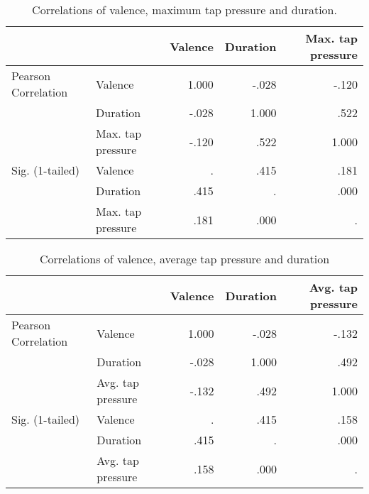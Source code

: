 \begin{table}[ht]
\centering
\begin{tabular}{@{}llrrr@{}}
                    &                   & Valence & Duration & Max. tap pressure \\ \midrule
Pearson Correlation & Valence           & 1.000   & -.028    & -.120             \\
                    & Duration          & -.028   & 1.000    & .522              \\
                    & Max. tap pressure & -.120   & .522     & 1.000             \\ \midrule
Sig. (1-tailed)     & Valence           & .       & .415     & .181              \\
                    & Duration          & .415    & .        & .000              \\
                    & Max. tap pressure & .181    & .000     & .                
\end{tabular}
\caption{Correlations of valence, maximum tap pressure and duration.}
\label{tab:correlations_valmax}
\end{table}

\par\bigskip

\begin{table}[ht]
\centering
\begin{tabular}{@{}llrrr@{}}
                    &                   & Valence & Duration & Avg. tap pressure \\ \midrule
Pearson Correlation & Valence           & 1.000   & -.028    & -.132             \\
                    & Duration          & -.028   & 1.000    & .492              \\
                    & Avg. tap pressure & -.132   & .492     & 1.000             \\ \midrule
Sig. (1-tailed)     & Valence           & .       & .415     & .158              \\
                    & Duration          & .415    & .        & .000              \\
                    & Avg. tap pressure & .158    & .000     & .                
\end{tabular}
\caption{Correlations of valence, average tap pressure and duration}
\label{tab:correlations_valavg}
\end{table}

\par\bigskip

